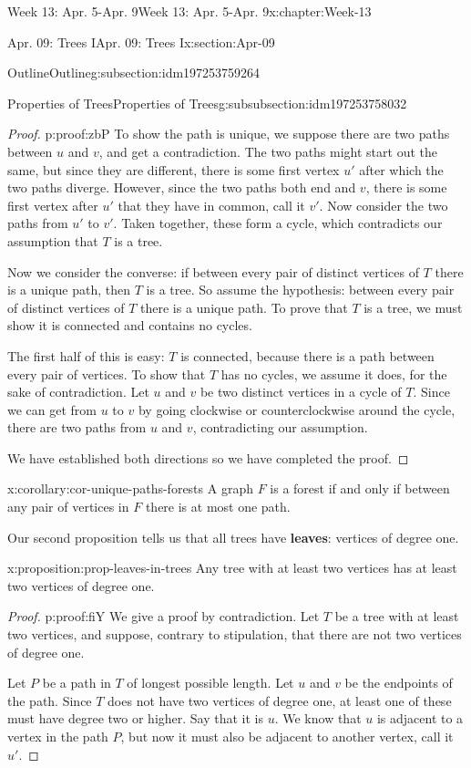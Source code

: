 \documentclass[oneside,10pt,]{book}
\newcommand{\terminology}[1]{\textbf{#1}}
\numberwithin{equation}{section}
\begin{document}
\begin{chapterptx}{Week 13: Apr. 5-Apr. 9}{}{Week 13: Apr. 5-Apr. 9}{}{}{x:chapter:Week-13}
\begin{sectionptx}{Apr. 09: Trees I}{}{Apr. 09: Trees I}{}{}{x:section:Apr-09}
\begin{subsectionptx}{Outline}{}{Outline}{}{}{g:subsection:idm197253759264}
\begin{subsubsectionptx}{Properties of Trees}{}{Properties of Trees}{}{}{g:subsubsection:idm197253758032}
\begin{proof}{}{p:proof:zbP}
To show the path is unique, we suppose there are two paths between \(u\) and \(v\), and get a contradiction.  The two paths might start out the same, but since they are different, there is some first vertex \(u'\) after which the two paths diverge.  However, since the two paths both end and \(v\), there is some first vertex after \(u'\) that they have in common, call it \(v'\).  Now consider the two paths from \(u'\) to \(v'\).  Taken together, these form a cycle, which contradicts our assumption that \(T\) is a tree.%
\par
Now we consider the converse: if between every pair of distinct vertices of \(T\) there is a unique path, then \(T\) is a tree.  So assume the hypothesis: between every pair of distinct vertices of \(T\) there is a unique path.  To prove that \(T\) is a tree, we must show it is connected and contains no cycles.%
\par
The first half of this is easy: \(T\) is connected, because there is a path between every pair of vertices.  To show that \(T\) has no cycles, we assume it does, for the sake of contradiction.  Let \(u\) and \(v\) be two distinct vertices in a cycle of \(T\).  Since we can get from \(u\) to \(v\) by going clockwise or counterclockwise around the cycle, there are two paths from \(u\) and \(v\), contradicting our assumption.%
\par
We have established both directions so we have completed the proof.%
\end{proof}
\begin{corollary}{}{}{x:corollary:cor-unique-paths-forests}%
A graph \(F\) is a forest if and only if between any pair of vertices in \(F\) there is at most one path.%
\end{corollary}
 Our second proposition tells us that all trees have \terminology{leaves}: vertices of degree one.%
\begin{proposition}{}{}{x:proposition:prop-leaves-in-trees}%
Any tree with at least two vertices has at least two vertices of degree one.%
\end{proposition}
\begin{proof}{}{p:proof:fiY}
We give a proof by contradiction.  Let \(T\) be a tree with at least two vertices, and suppose, contrary to stipulation, that there are not two vertices of degree one.%
\par
Let \(P\) be a path in \(T\) of longest possible length.  Let \(u\) and \(v\) be the endpoints of the path.  Since \(T\) does not have two vertices of degree one, at least one of these must have degree two or higher.  Say that it is \(u\).  We know that \(u\) is adjacent to a vertex in the path \(P\), but now it must also be adjacent to another vertex, call it \(u'\).%

\end{proof}
\end{subsubsectionptx}
\end{subsectionptx}
\end{sectionptx}
\end{chapterptx}
\end{document}
